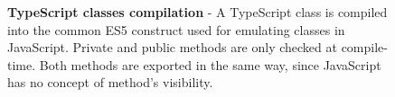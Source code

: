 \begin{figure}[tp]
	\centering
	\begin{lrbox}{\mintedbox}
		\begin{minipage}{0.9\textwidth}
		\end{minipage}
	\end{lrbox}
	\subfloat[index.ts]{\usebox{\mintedbox}}
	
	\begin{lrbox}{\mintedbox}
		\begin{minipage}{0.9\textwidth}
		\end{minipage}
	\end{lrbox}
	\subfloat[index.js]{\usebox{\mintedbox}}

	\caption[TypeScript classes compilation]{\textbf{TypeScript classes compilation} - A TypeScript class is compiled into the common ES5 construct used for emulating classes in JavaScript. Private and public methods are only checked at compile-time. Both methods are exported in the same way, since JavaScript has no concept of method's visibility.}
	\label{fig:background-typescript-class-example}
\end{figure}